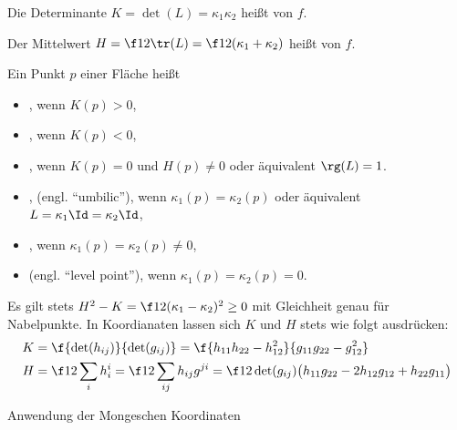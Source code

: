 \begin{df}
	Die Determinante $K = \det(L) = \kappa_1 \kappa_2$ heißt  von $f$.

	Der Mittelwert $H = \f 12 \tr(L) = \f 12 (\kappa_1 + \kappa_2)$ heißt  von $f$.

	Ein Punkt $p$ einer Fläche heißt
	\begin{itemize}
		\item
			, wenn $K(p) > 0$,
		\item
			, wenn $K(p) < 0$,
		\item
			, wenn $K(p) = 0$ und $H(p) \neq 0$ oder äquivalent $\rg(L) = 1$.
		\item
			, (engl. “umbilic”), wenn $\kappa_1(p) = \kappa_2(p)$ oder äquivalent $L = \kappa_1 \Id = \kappa_2 \Id$,
		\item
			, wenn $\kappa_1(p) = \kappa_2(p) \neq 0$,
		\item
			 (engl. “level point”), wenn $\kappa_1(p) = \kappa_2(p) = 0$.
	\end{itemize}
\end{df}

\begin{kor}
	Es gilt stets $H^2 - K = \f 12 (\kappa_1 - \kappa_2)^2 \ge 0$ mit Gleichheit genau für Nabelpunkte.
	In Koordianaten lassen sich $K$ und $H$ stets wie folgt ausdrücken:
	\begin{align*}
		K &= \f{\det(h_{ij})}{\det(g_{ij})}
		= \f{h_{11}h_{22} - h_{12}^2}{g_{11}g_{22} - g_{12}^2} \\
		H &= \f 12 \sum_{i} h_{i}^i = \f 12 \sum_{ij} h_{ij} g^{ji}
		= \f 1{2\det(g_{ij})} \big( h_{11} g_{22} - 2h_{12}g_{12} + h_{22}g_{11} \big)
	\end{align*}
\end{kor}


Anwendung der Mongeschen Koordinaten

